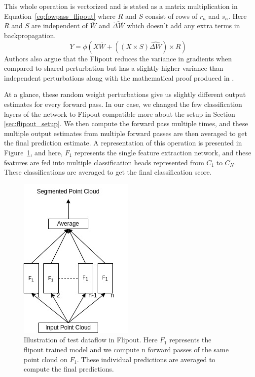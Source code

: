 This whole operation is vectorized and is stated as a matrix multiplication in Equation~\ref{eq:fowpass_flipout} where $R$ and $S$ consist of rows of $r_n$ and $s_n$.
Here $R$ and $S$ are independent of $\overline{W}$ and $\widehat{\Delta W}$ which doesn't add any extra terms in backpropagation.
\begin{equation}
    Y = \phi(X\overline{W}+((X\times S)\widehat{\Delta W})\times R)
    \label{eq:fowpass_flipout}
\end{equation}
Authors also argue that the Flipout reduces the variance in gradients when compared to shared perturbation but has a slightly higher variance than independent perturbations along with the mathematical proof produced in \cite{Flipout}.


At a glance, these random weight perturbations give us slightly different output estimates for every forward pass.
In our case, we changed the few classification layers of the network to Flipout compatible more about the setup in Section \ref{sec:flipout_setup}.
We then compute the forward pass multiple times, and these multiple output estimates from multiple forward passes are then averaged to get the final prediction estimate.
A representation of this operation is presented in Figure~\ref{fig:flipout_ex}, and here, $F_1$ represents the single feature extraction network, and these features are fed into multiple classification heads represented from $C_1$ to $C_N$.
These classifications are averaged to get the final classification score.

\begin{figure}
    \centering
    \includegraphics[scale=0.5]{images/flipout.jpg}
    \caption{Illustration of test dataflow in Flipout. Here $F_1$ represents the flipout trained model and we compute n forward passes of the same point cloud on $F_1$.
    These individual predictions are averaged to compute the final predictions.}
    \label{fig:flipout_ex}
\end{figure}
\FloatBarrier

